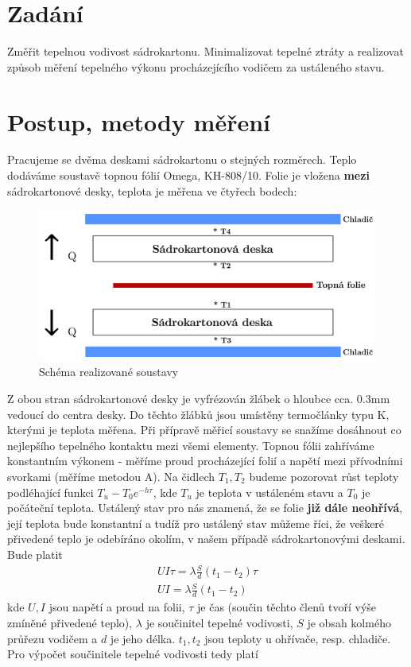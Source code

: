 \documentclass[czech,11pt,a4paper]{article}
\begin{document}
	
	\section{Zadání}
	Změřit tepelnou vodivost sádrokartonu. Minimalizovat tepelné ztráty a realizovat způsob měření tepelného výkonu procházejícího vodičem za ustáleného stavu.
	\section{Postup, metody měření}
	Pracujeme se dvěma deskami sádrokartonu o stejných rozměrech. Teplo dodáváme soustavě topnou fólií Omega, KH-808/10. Folie je vložena \textbf{mezi} sádrokartonové desky, teplota je měřena ve čtyřech bodech:
		\begin{figure}[H]
	\begin{center}
			\includegraphics[width=0.7\linewidth, ]{sestava}
			\caption{Schéma realizované soustavy}
	\end{center}
	\end{figure}
\noindent Z obou stran sádrokartonové desky je vyfrézován žlábek o hloubce cca. 0.3mm vedoucí do centra desky. Do těchto žlábků jsou umístěny termočlánky typu K, kterými je teplota měřena. Při přípravě měřicí soustavy se snažíme dosáhnout co nejlepšího tepelného kontaktu mezi všemi elementy.
Topnou fólii zahříváme konstantním výkonem - měříme proud procházející folií a napětí mezi přívodními svorkami (měříme metodou A). Na čidlech $T_1, T_2$ budeme pozorovat růst teploty podléhající funkci $T_u - T_0 e^{-h \tau}$, kde $T_u$ je teplota v ustáleném stavu a $T_0$ je počáteční teplota. Ustálený stav pro nás znamená, že se folie \textbf{již dále neohřívá}, její teplota bude konstantní a tudíž pro ustálený stav můžeme říci, že veškeré přivedené teplo je odebíráno okolím, v našem případě sádrokartonovými deskami. Bude platit
\begin{gather}
	UI \tau = \lambda \frac S d(t_1 - t_2)\tau\\
	UI = \lambda \frac{S}{d} (t_1 - t_2)
\end{gather} 
kde $U,I$ jsou napětí a proud na folii, $\tau$ je čas (součin těchto členů tvoří výše zmíněné přivedené teplo), $\lambda$ je součinitel tepelné vodivosti, $S$ je obsah kolmého průřezu vodičem a $d$ je jeho délka. $t_1, t_2$ jsou teploty u ohřívače, resp. chladiče. Pro výpočet součinitele tepelné vodivosti tedy platí
\end{document}
